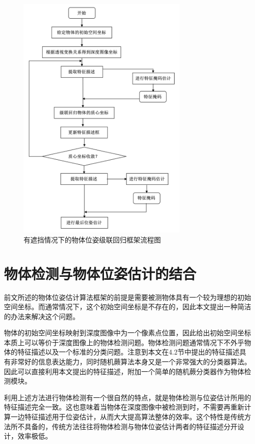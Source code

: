 \begin{figure}[htb]
	\centering 
	\includegraphics[width=0.75\textwidth]{./mypic/有遮挡情况下的物体位姿级联回归框架流程图.jpg} 
	\caption{有遮挡情况下的物体位姿级联回归框架流程图} 
\end{figure}


\section{物体检测与物体位姿估计的结合}

前文所述的物体位姿估计算法框架的前提是需要被测物体具有一个较为理想的初始空间坐标。而通常情况下，这个初始空间坐标是不存在的，因此本文提出一种简洁的办法来解决这个问题。

物体的初始空间坐标映射到深度图像中为一个像素点位置，因此给出初始空间坐标本质上可以等价于深度图像上的物体检测问题。物体检测问题通常情况下不外乎物体的特征描述以及一个标准的分类问题。注意到本文在4.2节中提出的特征描述具有非常好的信息表达能力，同时随机蕨算法本身又是一个非常强大的分类器算法。因此可以直接利用本文提出的特征描述，附加一个简单的随机蕨分类器作为物体检测模块。

利用上述方法进行物体检测有一个很自然的特点，就是物体检测与位姿估计所用的特征描述完全一致。这也意味着当物体在深度图像中被检测到时，不需要再重新计算一边特征描述用于位姿估计，从而大大提高算法整体的效率。这个特性是传统方法所不具备的，传统方法往往将物体检测与物体位姿估计两者的特征描述分开设计，效率极低。

